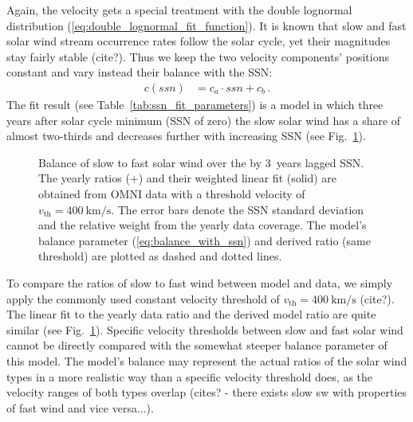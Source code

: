 Again, the velocity gets a special treatment with the double lognormal distribution (\ref{eq:double_lognormal_fit_function}). It is known that slow and fast solar wind stream occurrence rates follow the solar cycle, yet their magnitudes stay fairly stable (cite?). Thus we keep the two velocity components' positions constant and vary instead their balance with the SSN:
\begin{align}
	c(ssn) &= c_a \cdot ssn + c_b\,.	\label{eq:balance_with_ssn}
\end{align}
The fit result (see Table~\ref{tab:ssn_fit_parameters}) is a model in which three years after solar cycle minimum (SSN of zero) the slow solar wind has a share of almost two-thirds and decreases further with increasing SSN (see Fig.~\ref{fig:Vdbl_SSN_ratio_f_plot}).\\
\begin{figure}
	\caption{Balance of slow to fast solar wind over the by 3~years lagged SSN. The yearly ratios (+) and their weighted linear fit (solid) are obtained from OMNI data with a threshold velocity of $v_\text{th} = \SI{400}{\km\per\s}$. The error bars denote the SSN standard deviation and the relative weight from the yearly data coverage. The model's balance parameter (\ref{eq:balance_with_ssn}) and derived ratio (same threshold) are plotted as dashed and dotted lines.}
	\label{fig:Vdbl_SSN_ratio_f_plot}
\end{figure}
To compare the ratios of slow to fast wind between model and data, we simply apply the commonly used constant velocity threshold of $v_\text{th} = \SI{400}{\km\per\s}$ (cite?). The linear fit to the yearly data ratio and the derived model ratio are quite similar (see Fig.~\ref{fig:Vdbl_SSN_ratio_f_plot}). Specific velocity thresholds between slow and fast solar wind cannot be directly compared with the somewhat steeper balance parameter of this model. The model's balance may represent the actual ratios of the solar wind types in a more realistic way than a specific velocity threshold does, as the velocity ranges of both types overlap (cites? - there exists slow sw with properties of fast wind and vice versa...).

